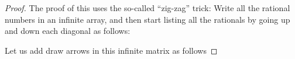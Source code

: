 \documentclass[11pt,dvipsnames]{book}
\numberwithin{figure}{section} %
\numberwithin{table}{section} %
\begin{document}
\begin{proof}
The proof of this uses the so-called ``zig-zag'' trick: Write all the rational numbers in an infinite array, and then start listing all the rationals by going up and down each diagonal as follows:

 Let us add draw arrows in this infinite matrix as
follows



\end{proof}
\end{document}
